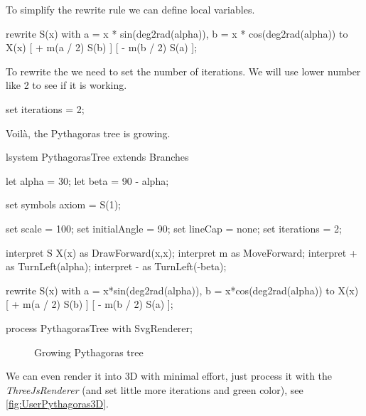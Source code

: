 To simplify the rewrite rule we can define local variables.

\begin{Lsystem}
rewrite S(x)
	with a = x * sin(deg2rad(alpha)), b = x * cos(deg2rad(alpha))
	to X(x) [ + m(a / 2) S(b) ] [ - m(b / 2) S(a) ];
\end{Lsystem}

To rewrite the \lsystem we need to set the number of iterations.
We will use lower number like 2 to see if it is working.

\begin{Lsystem}
set iterations = 2;
\end{Lsystem}

Voilà, the Pythagoras tree is growing.

\newsavebox{\lstBoxUserDocC}
\begin{lrbox}{\lstBoxUserDocC}
\begin{Lsystem60}
lsystem PythagorasTree extends Branches{
	let alpha = 30;
	let beta = 90 - alpha;

	set symbols axiom = S(1);
	
	set scale = 100;
	set initialAngle = 90;
	set lineCap = none;
	set iterations = 2;
	
	interpret S X(x) as DrawForward(x,x);
	interpret m as MoveForward;
	interpret + as TurnLeft(alpha);
	interpret - as TurnLeft(-beta);
	
	rewrite S(x)
		with a = x*sin(deg2rad(alpha)),
			b = x*cos(deg2rad(alpha))
		to X(x) [ + m(a / 2) S(b) ]
			[ - m(b / 2) S(a) ];
}
process PythagorasTree with SvgRenderer;
\end{Lsystem60}
\end{lrbox}

\begin{figure}[h!]
	\subfloat{
		\usebox{\lstBoxUserDocC}
	} \hfill
	\caption{Growing Pythagoras tree}
	\label{fig:userDoc3}
\end{figure}

We can even render it into 3D with minimal effort, just process it with the \emph{ThreeJsRenderer} (and set little more iterations and green color), see \autoref{fig:UserPythagoras3D}.


